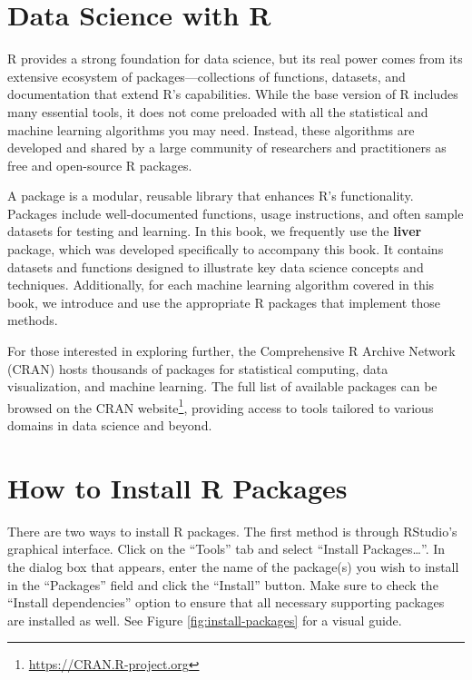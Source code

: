 \documentclass[
  11pt,
]{book}
\renewcommand{\href}[2]{#2\footnote{\url{#1}}}
\theoremstyle{definition}
\theoremstyle{definition}
\theoremstyle{definition}
\theoremstyle{definition}
\theoremstyle{remark}
\begin{document}
\section{Data Science with R}\label{data-science-with-r}

R provides a strong foundation for data science, but its real power comes from its extensive ecosystem of packages---collections of functions, datasets, and documentation that extend R's capabilities. While the base version of R includes many essential tools, it does not come preloaded with all the statistical and machine learning algorithms you may need. Instead, these algorithms are developed and shared by a large community of researchers and practitioners as free and open-source R packages.

A package is a modular, reusable library that enhances R's functionality. Packages include well-documented functions, usage instructions, and often sample datasets for testing and learning. In this book, we frequently use the \textbf{liver} package, which was developed specifically to accompany this book. It contains datasets and functions designed to illustrate key data science concepts and techniques. Additionally, for each machine learning algorithm covered in this book, we introduce and use the appropriate R packages that implement those methods.

For those interested in exploring further, the Comprehensive R Archive Network (CRAN) hosts thousands of packages for statistical computing, data visualization, and machine learning. The full list of available packages can be browsed on the \href{https://CRAN.R-project.org}{CRAN website}, providing access to tools tailored to various domains in data science and beyond.

\section{How to Install R Packages}\label{install-packages}

There are two ways to install R packages. The first method is through RStudio's graphical interface. Click on the ``Tools'' tab and select ``Install Packages\ldots{}''. In the dialog box that appears, enter the name of the package(s) you wish to install in the ``Packages'' field and click the ``Install'' button. Make sure to check the ``Install dependencies'' option to ensure that all necessary supporting packages are installed as well. See Figure \ref{fig:install-packages} for a visual guide.
\end{document}
